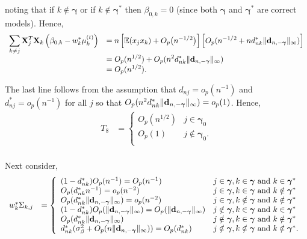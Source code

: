 \documentclass[11pt]{article}
\newtheorem{Main Result}{Main Result}
\def\vectorfontone{\bf}
\def\vectorfonttwo{\boldsymbol}
\def\vd{{\vectorfontone d}}                      %
\def\vgamma{{\vectorfonttwo \gamma}}             %
\def\matrixfontone{\bf}
\def\mX{{\matrixfontone X}}                      %
\def\bE{{\mathbb E}}                             %
\def\ds{\displaystyle}
\begin{document}
{\noindent noting that if $k\notin \vgamma$ or if $k\notin \vgamma^*$ then
$\beta_{0,k} = 0$ (since both $\vgamma$ and $\vgamma^*$ are correct models).
Hence,
$$
\begin{array}{rl}
\ds \sum_{k\ne j}  \mX_j^T\mX_k\left( \beta_{0,k} - w_k^* \mu_k^{(t)} \right)
& \ds =
n \left[ \bE(x_jx_k) + O_p\big(n^{-1/2}\big)\right]\left[ O_p(n^{-1/2} + nd_{nk}^*\|\vd_{n,-\vgamma}\|_\infty) \right] \\
& \ds =
O_p(n^{1/2}) + O_p(n^2d_{nk}^*\|\vd_{n,-\vgamma}\|_\infty) \\
& \ds =
O_p(n^{1/2}).
\end{array}
$$

\noindent The last line follows from the
assumption that
$d_{nj}=o_p(n^{-1})$
and $d_{nj}^*=o_p(n^{-1})$ for all $j$ so that
$O_p(n^2d_{nk}^*\|\vd_{n,-\vgamma}\|_\infty)=o_p(1)$.
Hence,
$$
\begin{array}{rl}
T_8
& \ds =
\left\{ \begin{array}{ll}
O_p(n^{1/2})     & j\in\vgamma_0 \\
O_p(1)    & j\notin\vgamma_0. \\
\end{array} \right. \\
\end{array}
$$



\noindent
Next consider,
$$
\begin{array}{rl}
w_k^{*} \Sigma_{k,j}
& \ds =
\left\{ \begin{array}{ll}
(1 - d_{nk}^*)O_p(n^{-1}) = O_p(n^{-1})
& \mbox{$j\in\vgamma, k \in \vgamma$ and $k\in\vgamma^*$} \\
O_p(d_{nk}^*n^{-1}) = o_p(n^{-2})
& \mbox{$j\in\vgamma, k \in \vgamma$ and $k\notin\vgamma^*$} \\
O_p(d_{nk}^*\|\vd_{n,-\vgamma}\|_\infty)= o_p(n^{-2})
& \mbox{$j\in\vgamma, k \notin \vgamma$ and $k\notin\vgamma^*$} \\
(1 - d_{nk}^*)O_p(\|\vd_{n,-\vgamma}\|_\infty)
= O_p(\|\vd_{n,-\vgamma}\|_\infty)
& \mbox{$j\notin\vgamma, k \in \vgamma$ and $k\in\vgamma^*$} \\
O_p(d_{nk}^*\|\vd_{n,-\vgamma}\|_\infty)
& \mbox{$j\notin\vgamma, k\in \vgamma$ and $k\notin\vgamma^*$} \\
d_{nk}^*(\sigma_\beta^2 + O_p(n\|\vd_{n,-\vgamma}\|_\infty)) = O_p(d_{nk}^*)
& \mbox{$j\notin\vgamma, k\notin \vgamma$ and $k\notin\vgamma^*$}.
\end{array} \right.
\end{array}
$$

}
\end{document}
